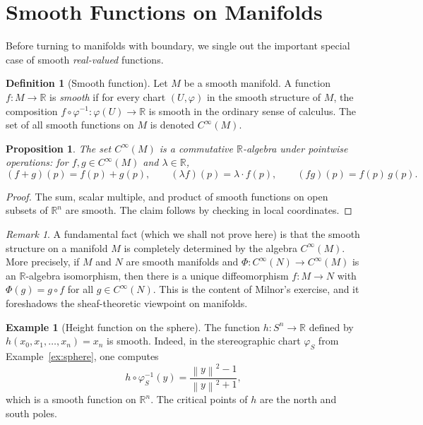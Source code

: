 \documentclass[12pt,a4paper,openany]{book}
\newtheorem{proposition}[theorem]{Proposition}
\theoremstyle{definition}
\newtheorem{definition}[theorem]{Definition}
\newtheorem{example}[theorem]{Example}
\theoremstyle{remark}
\newtheorem{remark}[theorem]{Remark}
\newcommand{\R}{\mathbb{R}}
\newcommand{\norm}[1]{\left\lVert #1 \right\rVert}
\begin{document}
\section{Smooth Functions on Manifolds}
\label{sec:smooth-functions}

Before turning to manifolds with boundary, we single out the important
special case of smooth \emph{real-valued} functions.

\begin{definition}[Smooth function]\label{def:smooth-function}
Let $M$ be a smooth manifold.  A function $f \colon M \to \R$ is
\emph{smooth} if for every chart $(U,\varphi)$ in the smooth structure
of $M$, the composition $f \circ \varphi^{-1} \colon \varphi(U) \to \R$
is smooth in the ordinary sense of calculus.  The set of all smooth
functions on $M$ is denoted $C^\infty(M)$.
\end{definition}

\begin{proposition}\label{prop:Cinfty-algebra}
The set $C^\infty(M)$ is a commutative $\R$-algebra under pointwise
operations: for $f, g \in C^\infty(M)$ and $\lambda \in \R$,
\[
  (f+g)(p) = f(p) + g(p), \qquad
  (\lambda f)(p) = \lambda \cdot f(p), \qquad
  (fg)(p) = f(p)\,g(p).
\]
\end{proposition}

\begin{proof}
The sum, scalar multiple, and product of smooth functions on open subsets
of $\R^n$ are smooth.  The claim follows by checking in local coordinates.
\end{proof}

\begin{remark}\label{rem:smooth-determines-structure}
A fundamental fact (which we shall not prove here) is that the smooth
structure on a manifold $M$ is completely determined by the algebra
$C^\infty(M)$.  More precisely, if $M$ and $N$ are smooth manifolds and
$\Phi \colon C^\infty(N) \to C^\infty(M)$ is an $\R$-algebra isomorphism,
then there is a unique diffeomorphism $f \colon M \to N$ with
$\Phi(g) = g \circ f$ for all $g \in C^\infty(N)$.  This is the content
of Milnor's exercise, and it foreshadows the sheaf-theoretic viewpoint on
manifolds.
\end{remark}

\begin{example}[Height function on the sphere]\label{ex:height-function}
The function $h \colon S^n \to \R$ defined by
$h(x_0, x_1, \ldots, x_n) = x_n$ is smooth.  Indeed, in the stereographic
chart $\varphi_S$ from Example~\ref{ex:sphere}, one computes
\[
  h \circ \varphi_S^{-1}(y) = \frac{\norm{y}^2 - 1}{\norm{y}^2 + 1},
\]
which is a smooth function on $\R^n$.  The critical points of $h$ are the
north and south poles.
\end{example}
\end{document}

